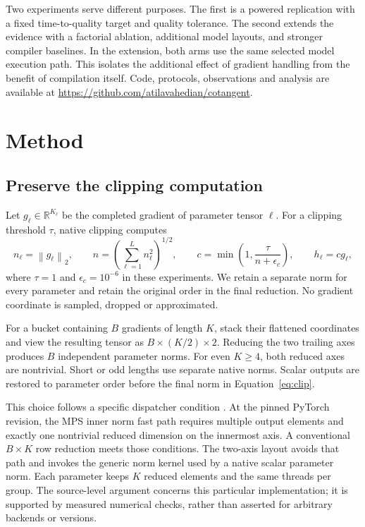 \documentclass[11pt]{article}
\newcommand{\R}{\mathbb{R}}
\newcommand{\norm}[1]{\left\lVert #1\right\rVert_2}
\begin{document}
Two experiments serve different purposes. The first is a powered replication
with a fixed time-to-quality target and quality tolerance. The second extends
the evidence with a factorial ablation, additional model layouts, and stronger
compiler baselines. In the extension, both arms use the same selected model
execution path. This isolates the additional effect of gradient handling from
the benefit of compilation itself. Code, protocols, observations and analysis
are available at \url{https://github.com/atilavahedian/cotangent}.

\section{Method}
\subsection{Preserve the clipping computation}
Let $g_\ell\in\R^{K_\ell}$ be the completed gradient of parameter tensor $\ell$.
For a clipping threshold $\tau$, native clipping computes
\begin{equation}
 n_\ell=\norm{g_\ell},\qquad
 n=\left(\sum_{\ell=1}^{L}n_\ell^2\right)^{1/2},\qquad
 c=\min\left(1,\frac{\tau}{n+\epsilon_c}\right),\qquad h_\ell=cg_\ell,
 \label{eq:clip}
\end{equation}
where $\tau=1$ and $\epsilon_c=10^{-6}$ in these experiments. We retain a
separate norm for every parameter and retain the original order in the final
reduction. No gradient coordinate is sampled, dropped or approximated.

For a bucket containing $B$ gradients of length $K$, stack their flattened
coordinates and view the resulting tensor as $B\times(K/2)\times2$. Reducing
the two trailing axes produces $B$ independent parameter norms. For even
$K\ge4$, both reduced axes are nontrivial. Short or odd lengths use separate
native norms. Scalar outputs are restored to parameter order before the final
norm in Equation~\ref{eq:clip}.

This choice follows a specific dispatcher condition \cite{mps}. At the pinned PyTorch
revision, the MPS inner norm fast path requires multiple output elements and
exactly one nontrivial reduced dimension on the innermost axis. A conventional
$B\times K$ row reduction meets those conditions. The two-axis layout avoids
that path and invokes the generic norm kernel used by a native scalar parameter
norm. Each parameter keeps $K$ reduced elements and the same threads per group.
The source-level argument concerns this particular implementation; it is
supported by measured numerical checks, rather than asserted for arbitrary
backends or versions.
\end{document}
